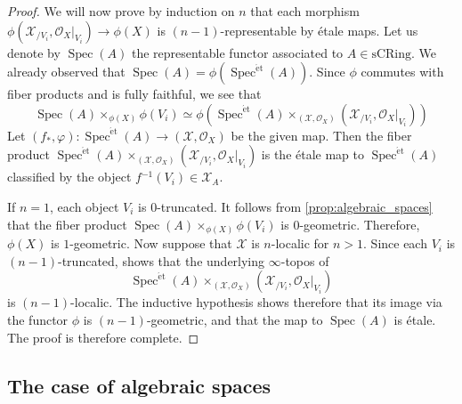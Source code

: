 \documentclass[12pt,a4paper,reqno]{amsart}
\theoremstyle{plain}
\theoremstyle{definition}
\theoremstyle{remark}
\numberwithin{equation}{section}
\begin{document}
\begin{proof}
	We will now prove by induction on $n$ that each morphism $\phi({\mathcal X}_{/V_i}, {\mathcal O}_X |_{V_i}) \to \phi(X)$ is $(n-1)$-representable by \'etale maps.
	Let us denote by $\operatorname{Spec}(A)$ the representable functor associated to $A \in \mathrm{sCRing}$.
	We already observed that $\operatorname{Spec}(A) = \phi(\operatorname{Spec}^{\mathrm{\acute{e}t}}(A))$.
	Since $\phi$ commutes with fiber products and is fully faithful, we see that
	\[ \operatorname{Spec}(A) \times_{\phi(X)} \phi(V_i) \simeq \phi(\operatorname{Spec}^{\mathrm{\acute{e}t}}(A) \times_{({\mathcal X}, {\mathcal O}_X)} ({\mathcal X}_{/V_i}, {\mathcal O}_X |_{V_i} )) \]
	Let $(f_*, \varphi) \colon \operatorname{Spec}^{\mathrm{\acute{e}t}}(A) \to ({\mathcal X}, {\mathcal O}_X)$ be the given map.
	Then the fiber product $\operatorname{Spec}^{\mathrm{\acute{e}t}}(A) \times_{({\mathcal X}, {\mathcal O}_X)} ({\mathcal X}_{/V_i}, {\mathcal O}_X |_{V_i} )$ is the \'etale map to $\operatorname{Spec}^{\mathrm{\acute{e}t}}(A)$ classified by the object $f{^{-1}}(V_i) \in {\mathcal X}_A$.
	
	If $n = 1$, each object $V_i$ is $0$-truncated.
	It follows from \cref{prop:algebraic_spaces} that the fiber product $\operatorname{Spec}(A) \times_{\phi(X)} \phi(V_i)$ is $0$-geometric.
	Therefore, $\phi(X)$ is $1$-geometric.	
	Now suppose that ${\mathcal X}$ is $n$-localic for $n > 1$.
	Since each $V_i$ is $(n-1)$-truncated, \cite[Lemma 2.3.16]{DAG-V} shows that the underlying $\infty$-topos of
	\[ \operatorname{Spec}^{\mathrm{\acute{e}t}}(A) \times_{({\mathcal X}, {\mathcal O}_X)} ({\mathcal X}_{/V_i}, {\mathcal O}_X |_{V_i} ) \]
	is $(n-1)$-localic.
	The inductive hypothesis shows therefore that its image via the functor $\phi$ is $(n-1)$-geometric, and that the map to $\operatorname{Spec}(A)$ is \'etale.
	The proof is therefore complete.
\end{proof}

\subsection{The case of algebraic spaces}
\end{document}
